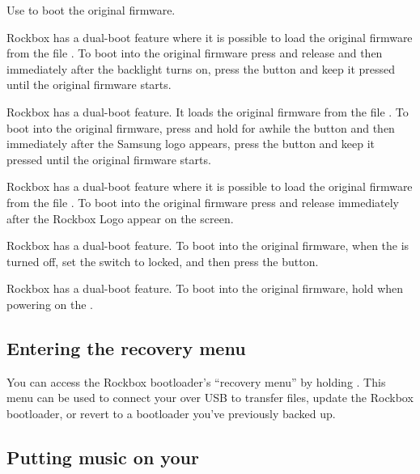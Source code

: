 {  
    {
    Use \ButtonPower{} to boot the original \playerman{} firmware.
    }

    {
    Rockbox has a dual-boot feature where it is possible to load the original firmware from
    the file . To boot into the original firmware press and release
    \ButtonPower{} and then immediately after the backlight turns on, press the \ButtonOK{}
    button and keep it pressed until the original firmware starts.
    }

    {
    Rockbox has a dual-boot feature. It loads the original firmware from
    the file . To boot into the original firmware, press and hold
    for awhile the \ButtonPlay{} button and then immediately after the Samsung logo appears,
    press the \ButtonLeft{} button and keep it pressed until the original firmware starts.
    }

    {
    Rockbox has a dual-boot feature where it is possible to load the original firmware from
    the file . To boot into the original firmware press and release
    \ButtonPower{} immediately after the Rockbox Logo appear on the screen.
    }

    {
    Rockbox has a dual-boot feature. To boot into the original firmware,
    when the \dap{} is turned off, set the \ButtonLock{} switch to locked,
    and then press the \ButtonPower{} button.
    }

    {
    Rockbox has a dual-boot feature. To boot into the original firmware,
    hold \ActionBootOFPlayer{} when powering on the \dap{}.


    \subsection{Entering the recovery menu}
    You can access the Rockbox bootloader's ``recovery menu'' by holding
    \ActionBootRecoveryMenu{}. This menu can be used to connect your \dap{}
    over USB to transfer files, update the Rockbox bootloader, or revert to a
    bootloader you've previously backed up.
    }

  }
\subsection{Putting music on your \dap{}}

